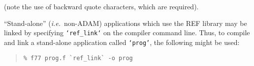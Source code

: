 \documentclass[twoside,11pt]{article}
\begin{document}
(note the use of backward quote characters, which are required).

``Stand-alone'' (\emph{i.e.}\ non-ADAM) applications which use the REF library
may be linked by specifying \texttt{`ref\_link`} on the compiler
command line. Thus, to compile and link a stand-alone application
called \texttt{`prog'}, the following might be used:

\begin{quote}
\begin{verbatim}
% f77 prog.f `ref_link` -o prog
\end{verbatim}
\end{quote}












\newlength{\sstbannerlength}
\newlength{\sstcaptionlength}
\newlength{\sstexampleslength}
\newlength{\sstexampleswidth}
\end{document}
